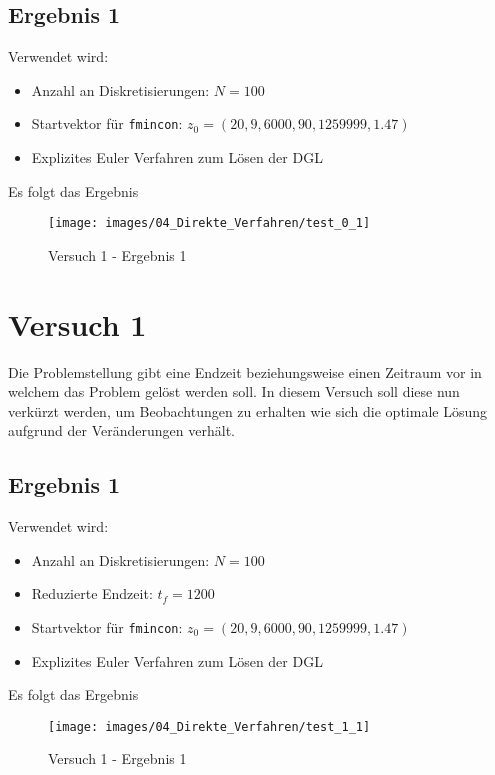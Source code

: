 \subsection{Ergebnis 1}\label{kap:Versuch0Ergebnis1}
Verwendet wird:
\begin{itemize}
\item Anzahl an Diskretisierungen: $N = 100$ 
\item Startvektor für \texttt{fmincon}: $z_0 = (20,9,6000,90,1259999,1.47)$
\item Explizites Euler Verfahren zum Lösen der DGL
\end{itemize}
Es folgt das Ergebnis
\begin{figure}[H]
\begin{center}
\texttt{[image: images/04\_Direkte\_Verfahren/test\_0\_1]}
\caption{Versuch 1 - Ergebnis 1}\label{img:test_0_1}
\end{center}
\end{figure}
















\newpage
\section{Versuch 1}\label{kap:Versuch1}
Die Problemstellung gibt eine Endzeit beziehungsweise einen Zeitraum vor in welchem das Problem gelöst werden soll. In diesem Versuch soll diese nun verkürzt werden, um Beobachtungen zu erhalten wie sich die optimale Lösung aufgrund der Veränderungen verhält.

\subsection{Ergebnis 1}
Verwendet wird:
\begin{itemize}
\item Anzahl an Diskretisierungen: $N = 100$ 
\item Reduzierte Endzeit: $t_f = 1200$
\item Startvektor für \texttt{fmincon}: $z_0 = (20,9,6000,90,1259999,1.47)$
\item Explizites Euler Verfahren zum Lösen der DGL
\end{itemize}
Es folgt das Ergebnis
\begin{figure}[H]
\begin{center}
\texttt{[image: images/04\_Direkte\_Verfahren/test\_1\_1]}
\caption{Versuch 1 - Ergebnis 1}\label{img:test_1_1}
\end{center}
\end{figure}

